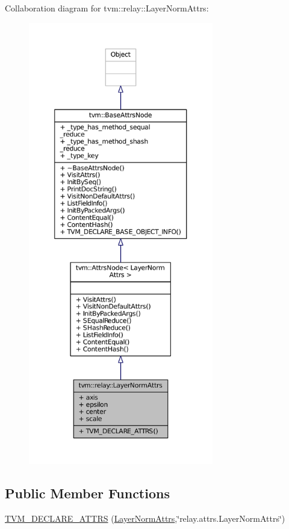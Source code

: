 Collaboration diagram for tvm\+:\+:relay\+:\+:Layer\+Norm\+Attrs\+:
\nopagebreak
\begin{figure}[H]
\begin{center}
\leavevmode
\includegraphics[height=550pt]{structtvm_1_1relay_1_1LayerNormAttrs__coll__graph}
\end{center}
\end{figure}
\subsection*{Public Member Functions}
\begin{DoxyCompactItemize}
\item 
\hyperlink{structtvm_1_1relay_1_1LayerNormAttrs_a20df027f67277a95e2418a0434daa60d}{T\+V\+M\+\_\+\+D\+E\+C\+L\+A\+R\+E\+\_\+\+A\+T\+T\+RS} (\hyperlink{structtvm_1_1relay_1_1LayerNormAttrs}{Layer\+Norm\+Attrs},\char`\"{}relay.\+attrs.\+Layer\+Norm\+Attrs\char`\"{})
\end{DoxyCompactItemize}
